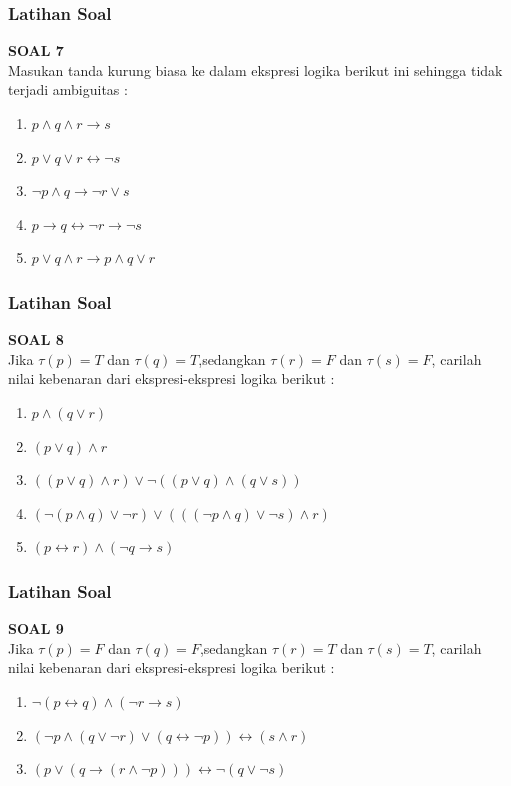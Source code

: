 \documentclass[handout]{beamer}
\theoremstyle{definition}
\theoremstyle{example}
\begin{document}
\begin{frame}
	\frametitle{Latihan Soal}
	\textbf{SOAL 7}\\	
    Masukan tanda kurung biasa ke dalam ekspresi logika berikut ini sehingga tidak terjadi ambiguitas : \\	 	
	\begin{enumerate}
		\item $p \wedge q \wedge r \rightarrow s$
		\item $p \vee q \vee r \leftrightarrow \neg s$
		\item $\neg p \wedge q \rightarrow \neg r \vee s$	
		\item $p \rightarrow q \leftrightarrow \neg r \rightarrow \neg s$
		\item $p \vee q \wedge r \rightarrow p \wedge q \vee r$		
	\end{enumerate}		
\end{frame}

\begin{frame}
	\frametitle{Latihan Soal}
	\textbf{SOAL 8}\\	
     Jika $\tau(p)=T$ dan $\tau(q)=T$,sedangkan $\tau(r)=F$ dan $\tau(s)=F$, carilah nilai kebenaran dari ekspresi-ekspresi logika berikut  : \\	 	
	\begin{enumerate}
		\item $p \wedge (q \vee r)$
		\item $(p \vee q) \wedge r$
		\item $((p\vee q)\wedge r) \vee \neg((p \vee q)\wedge (q\vee s))$	
		\item $(\neg(p \wedge q)\vee \neg r) \vee (((\neg p \wedge q)\vee \neg s) \wedge r)$
		\item $(p \leftrightarrow r) \wedge (\neg q \rightarrow s)$		
	\end{enumerate}		
\end{frame}

\begin{frame}
	\frametitle{Latihan Soal}
	\textbf{SOAL 9}\\	
	Jika $\tau(p)=F$ dan $\tau(q)=F$,sedangkan $\tau(r)=T$ dan $\tau(s)=T$, carilah nilai kebenaran dari ekspresi-ekspresi logika berikut  : \\	 	
	\begin{enumerate}
		\item $\neg(p \leftrightarrow q)\wedge (\neg r \rightarrow s)$
		\item $(\neg p \wedge (q \vee \neg r)\vee (q \leftrightarrow \neg p)) \leftrightarrow (s \wedge r)$
		\item $(p \vee (q \rightarrow (r \wedge \neg p))) \leftrightarrow \neg (q \vee \neg s)$		
	\end{enumerate}		
\end{frame}
\end{document}
